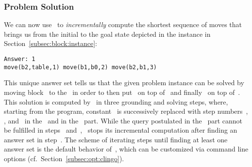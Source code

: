 \subsubsection{Problem Solution}\label{subsec:block:solution}

\tbrw
We can now use \clingo\ to \emph{incrementally} compute the shortest
sequence of moves that brings us from the initial to the goal state
depicted in the instance in Section~\ref{subsec:block:instance}:%
%
\begin{lstlisting}[numbers=none]
Answer: 1
move(b2,table,1) move(b1,b0,2) move(b2,b1,3)
\end{lstlisting}
%
This unique answer set tells us that the given problem instance can
be solved by moving block~ to the~ in order to
then put~ on top of~ and finally~ on top of~.
This solution is computed by \clingo\ in three grounding and solving steps,
where, starting from the  program, constant~
is successively replaced with step numbers~, , and~
in the~ and in the~ part.
While the query postulated in the~ part cannot be
fulfilled in steps~ and~, \clingo\ 
stops its incremental computation after finding an answer set in step~.
The scheme of iterating steps until finding at least one answer set
is the default behavior of~\clingo,
which can be customized via command line options
(cf.\ Section~\ref{subsec:opt:clingo}).

